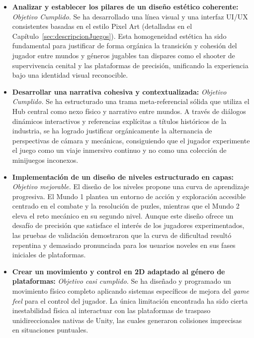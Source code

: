 \begin{itemize}
    \item \textbf{Analizar y establecer los pilares de un diseño estético coherente:} \textit{Objetivo Cumplido.} Se ha desarrollado una línea visual y una interfaz UI/UX consistentes basadas en el estilo Pixel Art (detalladas en el Capítulo~\ref{sec:descripcionJuegos}). Esta homogeneidad estética ha sido fundamental para justificar de forma orgánica la transición y cohesión del jugador entre mundos y géneros jugables tan dispares como el shooter de supervivencia cenital y las plataformas de precisión, unificando la experiencia bajo una identidad visual reconocible.
    
    \item \textbf{Desarrollar una narrativa cohesiva y contextualizada:} \textit{Objetivo Cumplido.} Se ha estructurado una trama meta-referencial sólida que utiliza el Hub central como nexo físico y narrativo entre mundos. A través de diálogos dinámicos interactivos y referencias explícitas a títulos históricos de la industria, se ha logrado justificar orgánicamente la alternancia de perspectivas de cámara y mecánicas, consiguiendo que el jugador experimente el juego como un viaje inmersivo continuo y no como una colección de minijuegos inconexos.
    
    \item \textbf{Implementación de un diseño de niveles estructurado en capas:} \textit{Objetivo mejorable.} El diseño de los niveles propone una curva de aprendizaje progresiva. El Mundo 1 plantea un entorno de acción y exploración accesible centrado en el combate y la resolución de puzles, mientras que el Mundo 2 eleva el reto mecánico en su segundo nivel. Aunque este diseño ofrece un desafío de precisión que satisface el interés de los jugadores experimentados, las pruebas de validación demostraron que la curva de dificultad resultó repentina y demasiado pronunciada para los usuarios noveles en sus fases iniciales de plataformas.
    
    \item \textbf{Crear un movimiento y control en 2D adaptado al género de plataformas:} \textit{Objetivo casi cumplido.} Se ha diseñado y programado un movimiento físico completo aplicando sistemas específicos de mejora del \textit{game feel} para el control del jugador. La única limitación encontrada ha sido cierta inestabilidad física al interactuar con las plataformas de traspaso unidireccionales nativas de Unity, las cuales generaron colisiones imprecisas en situaciones puntuales.
    

\end{itemize}
